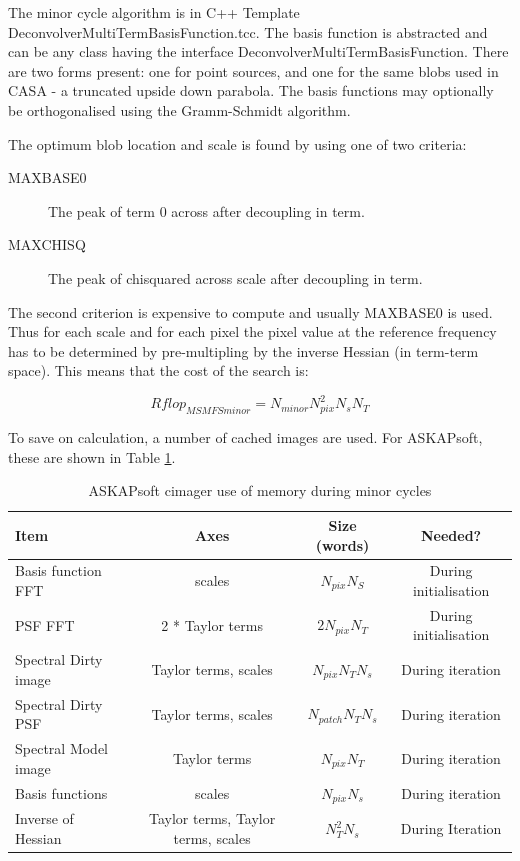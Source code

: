 \documentclass[11pt,a4paper]{article}
\begin{document}
The minor cycle  algorithm is in C++ Template DeconvolverMultiTermBasisFunction.tcc. The basis function is abstracted and can be any class having the interface DeconvolverMultiTermBasisFunction. There are two forms present: one for point sources, and one for the same blobs used in CASA - a truncated upside down parabola. The basis functions may optionally be orthogonalised using the Gramm-Schmidt algorithm.

The optimum blob location and scale is found by using one of two criteria:

\begin{description}
\item[MAXBASE0] The peak of term 0 across after decoupling in term.
\item[MAXCHISQ] The peak of chisquared across scale after decoupling in term.
\end{description}

The second criterion is expensive to compute and usually MAXBASE0 is used. Thus for each scale and for each pixel the pixel value at the reference frequency has to be determined by pre-multipling by the inverse Hessian (in term-term space). This means that the cost of the search is:

\begin{equation}
Rflop_{MSMFSminor} = N_{minor} N_{pix}^2 N_s N_T	
\end{equation}


To save on calculation, a number of cached images are used. For ASKAPsoft, these are shown in Table \ref{tab:askapmemory}.

\begin{table}[tbh]
\caption{ASKAPsoft cimager use of memory during minor cycles}\label{tab:askapmemory}

\begin{tabular}{|l|c|c|c|}
\hline
Item & Axes & Size (words) & Needed? \\
\hline
Basis function FFT & scales & $N_{pix} N_S $ & During initialisation \\
PSF FFT & 2 * Taylor terms & $2 N_{pix} N_T $ & During initialisation \\
Spectral Dirty image & Taylor terms, scales & $N_{pix} N_T N_s$ & During iteration \\
Spectral Dirty PSF & Taylor terms, scales & $N_{patch} N_T N_s$ & During iteration \\
Spectral Model image & Taylor terms & $N_{pix} N_T $ & During iteration \\	
Basis functions & scales & $N_{pix} N_s$ & During iteration \\
Inverse of Hessian & Taylor terms, Taylor terms, scales & $N^2_T N_s$ & During Iteration \\
\hline
\end{tabular}	
\end{table}
\end{document}

